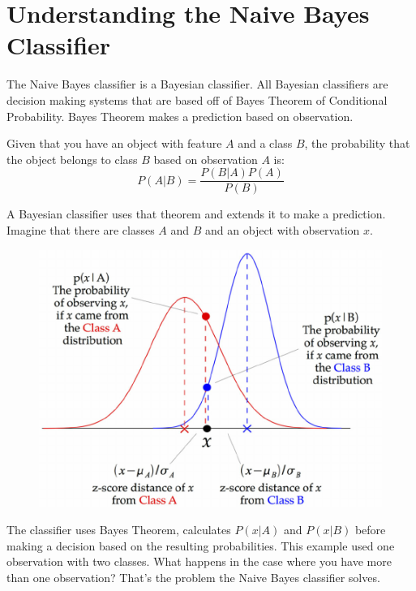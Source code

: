 \documentclass[11pt, twoside, reqno]{book}
\begin{document}
\section{Understanding the Naive Bayes Classifier}
\hspace{0.2in} The Naive Bayes classifier is a Bayesian classifier. All Bayesian classifiers are decision making systems that are based off of Bayes Theorem of Conditional Probability. Bayes Theorem makes a prediction based on observation. 

Given that you have an object with feature $A$ and a class $B$, the probability that the object belongs to class $B$ based on observation $A$ is:
\begin{equation}
\label{eq:bayes}
P(A|B) = \dfrac{P(B|A)P(A)}{P(B)}
\end{equation}

A Bayesian classifier uses that theorem and extends it to make a prediction. Imagine that there are classes $A$ and $B$ and an object with observation $x$. 
\begin{figure}[H]
\centering
	\includegraphics[scale=0.5]{bayes}
\end{figure}
The classifier uses Bayes Theorem, calculates $P(x|A)$ and $P(x|B)$ before making a decision based on the resulting probabilities. This example used one observation with two classes. What happens in the case where you have more than one observation? That's the problem the Naive Bayes classifier solves. 
\end{document}
